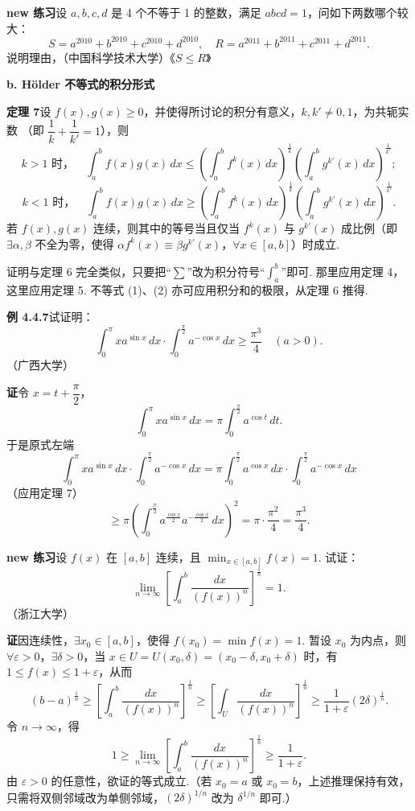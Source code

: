 \documentclass[UTF8, 12pt, fontset=fandol, oneside]{ctexart}
\begin{document}
\noindent\textbf{new 练习}\quad 设 $a,b,c,d$ 是 4 个不等于 1 的整数，满足 $abcd=1$，问如下两数哪个较大：
\[
S=a^{2010}+b^{2010}+c^{2010}+d^{2010},\quad
R=a^{2011}+b^{2011}+c^{2011}+d^{2011}.
\]
说明理由，（中国科学技术大学）\hfill《$S\le R$》

\noindent\textbf{b. Hölder 不等式的积分形式}

\noindent\textbf{定理 7}\quad 设 $f(x),g(x)\ge0$，并使得所讨论的积分有意义，$k,k'\ne0,1$，为共轭实数
（即 $\dfrac1k+\dfrac1{k'}=1$），则
\[
k>1\text{ 时，}\quad
\int_a^b f(x)g(x)\,dx
\le\left(\int_a^b f^k(x)\,dx\right)^{\frac1k}
\left(\int_a^b g^{k'}(x)\,dx\right)^{\frac1{k'}}; \tag{1}
\]
\[
k<1\text{ 时，}\quad
\int_a^b f(x)g(x)\,dx
\ge\left(\int_a^b f^k(x)\,dx\right)^{\frac1k}
\left(\int_a^b g^{k'}(x)\,dx\right)^{\frac1{k'}}. \tag{2}
\]
若 $f(x),g(x)$ 连续，则其中的等号当且仅当 $f^k(x)$ 与 $g^{k'}(x)$ 成比例（即 $\exists\alpha,\beta$ 不全为零，使得
$\alpha f^k(x)\equiv\beta g^{k'}(x)$，$\forall x\in[a,b]$）时成立.

证明与定理 6 完全类似，只要把“$\sum$”改为积分符号“$\displaystyle\int_a^b$”即可. 那里应用定理 4，这里应用定理 5.
不等式 (1)、(2) 亦可应用积分和的极限，从定理 6 推得.

\noindent\textbf{例 4.4.7}\quad 试证明：
\[
\int_0^\pi x a^{\sin x}\,dx\cdot\int_0^{\frac\pi2}a^{-\cos x}\,dx
\ge\frac{\pi^3}4\quad(a>0). \tag{1}
\]
（广西大学）

\noindent\textbf{证}\quad 令 $x=t+\dfrac\pi2$，
\[
\int_0^\pi x a^{\sin x}\,dx
=\pi\int_0^{\frac\pi2}a^{\cos t}\,dt.
\]
于是原式左端
\[
\int_0^\pi x a^{\sin x}\,dx\cdot\int_0^{\frac\pi2}a^{-\cos x}\,dx
=\pi\int_0^{\frac\pi2}a^{\cos x}\,dx\cdot\int_0^{\frac\pi2}a^{-\cos x}\,dx
\]
（应用定理 7）
\[
\ge \pi\left(\int_0^{\frac\pi2}a^{\frac{\cos x}{2}}a^{-\frac{\cos x}{2}}\,dx\right)^2
=\pi\cdot\frac{\pi^2}4=\frac{\pi^3}4.
\]

\noindent\textbf{new 练习}\quad 设 $f(x)$ 在 $[a,b]$ 连续，且 $\displaystyle\min_{x\in[a,b]}f(x)=1$. 试证：
\[
\lim_{n\to\infty}\left[\int_a^b\frac{dx}{(f(x))^n}\right]^{\frac1n}=1.
\]
（浙江大学）

\noindent\textbf{证}\quad 因连续性，$\exists x_0\in[a,b]$，使得 $f(x_0)=\min f(x)=1$.
暂设 $x_0$ 为内点，则 $\forall\varepsilon>0$，$\exists\delta>0$，当
$x\in U=U(x_0,\delta)=(x_0-\delta,x_0+\delta)$ 时，有 $1\le f(x)\le1+\varepsilon$，从而
\[
(b-a)^{\frac1n}\ge
\left[\int_a^b\frac{dx}{(f(x))^n}\right]^{\frac1n}
\ge \left[\int_U\frac{dx}{(f(x))^n}\right]^{\frac1n}
\ge \frac1{1+\varepsilon}(2\delta)^{\frac1n}.
\]
令 $n\to\infty$，得
\[
1\ge\lim_{n\to\infty}\left[\int_a^b\frac{dx}{(f(x))^n}\right]^{\frac1n}
\ge\frac1{1+\varepsilon}.
\]
由 $\varepsilon>0$ 的任意性，欲证的等式成立.（若 $x_0=a$ 或 $x_0=b$，上述推理保持有效，只需将双侧邻域改为单侧邻域，$(2\delta)^{1/n}$ 改为 $\delta^{1/n}$ 即可.）
\end{document}
